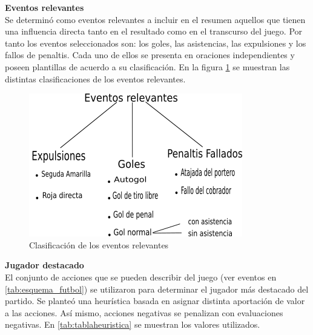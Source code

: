     \textbf{Eventos relevantes}\\

    Se determinó como eventos relevantes a incluir en el resumen aquellos que tienen una influencia directa 
tanto en el resultado como en el transcurso del juego. Por tanto los eventos seleccionados son: los goles, las asistencias, 
las expulsiones y los fallos de penaltis. Cada uno de ellos se presenta en oraciones independientes y poseen plantillas de acuerdo 
a su clasificación. En la figura \ref{fig_clasificacioneventos} se muestran las distintas clasificaciones de los eventos relevantes.\\


    \begin{figure}[!]
        \begin{center}
            \includegraphics[scale=0.9]{Graphics/clasificacioneventosrel.png}
        \end{center}
        \caption{Clasificación de los eventos relevantes}
        \label{fig_clasificacioneventos}
    \end{figure}

    \textbf{Jugador destacado}\\

    El conjunto de acciones que se pueden describir del juego (ver eventos en \ref{tab:esquema_futbol}) se utilizaron para 
determinar el jugador más destacado del partido. Se planteó una heurística basada en asignar distinta aportación de valor a 
las acciones. Así mismo, acciones negativas se penalizan con evaluaciones negativas.
 En \ref{tab:tablaheuristica} se muestran los valores utilizados.



